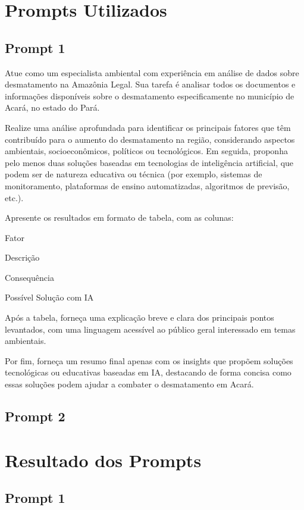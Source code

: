 \documentclass[12pt, a4paper, onecolumn, notitlepage]{article}
\begin{document}
    \section{Prompts Utilizados}
    \subsection{Prompt 1}
    Atue como um especialista ambiental com experiência em análise de dados sobre desmatamento na Amazônia Legal. Sua tarefa é analisar todos os documentos e informações disponíveis sobre o desmatamento especificamente no município de Acará, no estado do Pará.

    Realize uma análise aprofundada para identificar os principais fatores que têm contribuído para o aumento do desmatamento na região, considerando aspectos ambientais, socioeconômicos, políticos ou tecnológicos. Em seguida, proponha pelo menos duas soluções baseadas em tecnologias de inteligência artificial, que podem ser de natureza educativa ou técnica (por exemplo, sistemas de monitoramento, plataformas de ensino automatizadas, algoritmos de previsão, etc.).

    Apresente os resultados em formato de tabela, com as colunas:

    Fator

    Descrição

    Consequência

    Possível Solução com IA

    Após a tabela, forneça uma explicação breve e clara dos principais pontos levantados, com uma linguagem acessível ao público geral interessado em temas ambientais.

    Por fim, forneça um resumo final apenas com os insights que propõem soluções tecnológicas ou educativas baseadas em IA, destacando de forma concisa como essas soluções podem ajudar a combater o desmatamento em Acará.

    \subsection{Prompt 2}


    \section{Resultado dos Prompts}
    \subsection{Prompt 1}
\end{document}
